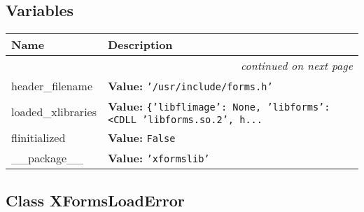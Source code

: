 
  \subsection{Variables}

    \vspace{-1cm}
\hspace{\varindent}\begin{longtable}{|p{\varnamewidth}|p{\vardescrwidth}|l}
\cline{1-2}
\cline{1-2} \centering \textbf{Name} & \centering \textbf{Description}& \\
\cline{1-2}
\endhead\cline{1-2}\multicolumn{3}{r}{\small\textit{continued on next page}}\\\endfoot\cline{1-2}
\endlastfoot\raggedright h\-e\-a\-d\-e\-r\-\_\-f\-i\-l\-e\-n\-a\-m\-e\- & \raggedright \textbf{Value:} 
{\tt \texttt{'}\texttt{/usr/include/forms.h}\texttt{'}}&\\
\cline{1-2}
\raggedright l\-o\-a\-d\-e\-d\-\_\-x\-l\-i\-b\-r\-a\-r\-i\-e\-s\- & \raggedright \textbf{Value:} 
{\tt \texttt{\{}\texttt{'}\texttt{libflimage}\texttt{'}\texttt{: }None\texttt{, }\texttt{'}\texttt{libforms}\texttt{'}\texttt{: }{\textless}CDLL 'libforms.so.2', h\texttt{...}}&\\
\cline{1-2}
\raggedright f\-l\-i\-n\-i\-t\-i\-a\-l\-i\-z\-e\-d\- & \raggedright \textbf{Value:} 
{\tt False}&\\
\cline{1-2}
\raggedright \_\-\_\-p\-a\-c\-k\-a\-g\-e\-\_\-\_\- & \raggedright \textbf{Value:} 
{\tt \texttt{'}\texttt{xformslib}\texttt{'}}&\\
\cline{1-2}
\end{longtable}



\subsection{Class XFormsLoadError}

